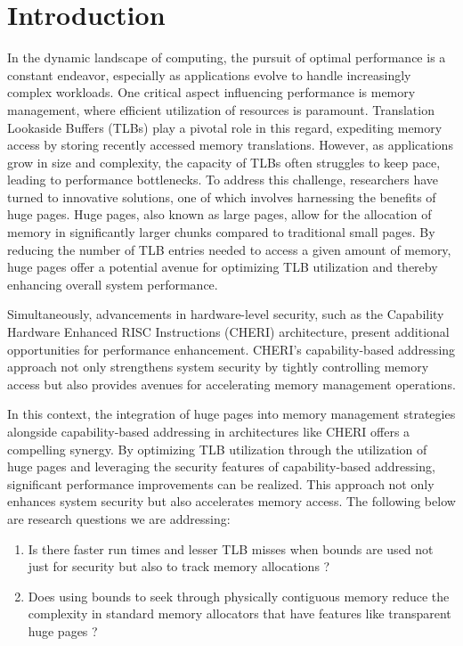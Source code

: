 \chapter{Introduction}

\ifpdf
    \graphicspath{{Introduction/Figs/Raster/}{Introduction/Figs/PDF/}{Introduction/Figs/}}
\else
    \graphicspath{{Introduction/Figs/Vector/}{Introduction/Figs/}}
\fi

In the dynamic landscape of computing, the pursuit of optimal performance is a constant endeavor, 
especially as applications evolve to handle increasingly complex workloads. 
One critical aspect influencing performance is memory management, where efficient 
utilization of resources is paramount. Translation Lookaside Buffers (TLBs) play a 
pivotal role in this regard, expediting memory access by storing recently accessed memory translations.
However, as applications grow in size and complexity, the capacity of TLBs often struggles to 
keep pace, leading to performance bottlenecks. To address this challenge, researchers have 
turned to innovative solutions, one of which involves harnessing the benefits of huge pages.
Huge pages, also known as large pages, allow for the allocation of memory in significantly 
larger chunks compared to traditional small pages. By reducing the number of TLB entries 
needed to access a given amount of memory, huge pages offer a potential avenue for optimizing 
TLB utilization and thereby enhancing overall system performance.

Simultaneously, advancements in hardware-level security, such as the Capability Hardware 
Enhanced RISC Instructions (CHERI) architecture, present additional opportunities for 
performance enhancement. CHERI's capability-based addressing approach not only strengthens 
system security by tightly controlling memory access but also provides avenues for 
accelerating memory management operations.

In this context, the integration of huge pages into memory management 
strategies alongside capability-based addressing in architectures like 
CHERI offers a compelling synergy. By optimizing TLB utilization through the 
utilization of huge pages and leveraging the security features of capability-based addressing, 
significant performance improvements can be realized. This approach not only enhances 
system security but also accelerates memory access. The following below are research questions 
we are addressing:
\begin{enumerate}
    \item Is there faster run times and lesser TLB misses when bounds are used not just for security but
    also to track memory allocations ? 
    \item Does using bounds to seek through physically contiguous memory reduce the complexity in standard 
    memory allocators that have features like transparent huge pages ?
  \end{enumerate}

